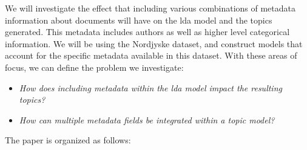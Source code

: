 We will investigate the effect that including various combinations of metadata information about documents will have on the \gls{lda} model and the topics generated.
This metadata includes authors as well as higher level categorical information.
We will be using the Nordjyske dataset, and construct models that account for the specific metadata available in this dataset.
With these areas of focus, we can define the problem we investigate:

\begin{itemize}
	\item \textit{How does including metadata within the \gls{lda} model impact the resulting topics?}
	\item \textit{How can multiple metadata fields be integrated within a topic model?}
\end{itemize}
	
The paper is organized as follows: 

